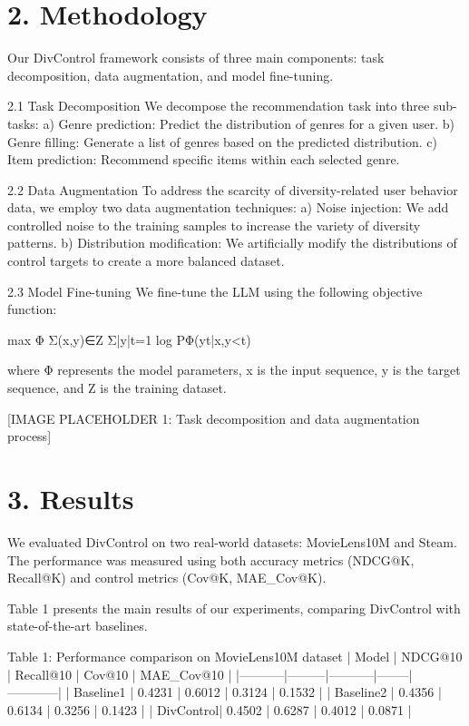 \documentclass[10pt,twocolumn,letterpaper]{article}
\begin{document}
\section{2. Methodology}

Our DivControl framework consists of three main components: task decomposition, data augmentation, and model fine-tuning.

2.1 Task Decomposition
We decompose the recommendation task into three sub-tasks:
a) Genre prediction: Predict the distribution of genres for a given user.
b) Genre filling: Generate a list of genres based on the predicted distribution.
c) Item prediction: Recommend specific items within each selected genre.

2.2 Data Augmentation
To address the scarcity of diversity-related user behavior data, we employ two data augmentation techniques:
a) Noise injection: We add controlled noise to the training samples to increase the variety of diversity patterns.
b) Distribution modification: We artificially modify the distributions of control targets to create a more balanced dataset.

2.3 Model Fine-tuning
We fine-tune the LLM using the following objective function:

max Φ Σ(x,y)∈Z Σ|y|t=1 log PΦ(yt|x,y<t)

where Φ represents the model parameters, x is the input sequence, y is the target sequence, and Z is the training dataset.

[IMAGE PLACEHOLDER 1: Task decomposition and data augmentation process]

\section{3. Results}

We evaluated DivControl on two real-world datasets: MovieLens10M and Steam. The performance was measured using both accuracy metrics (NDCG@K, Recall@K) and control metrics (Cov@K, MAE_Cov@K).

Table 1 presents the main results of our experiments, comparing DivControl with state-of-the-art baselines.

Table 1: Performance comparison on MovieLens10M dataset
| Model     | NDCG@10 | Recall@10 | Cov@10 | MAE_Cov@10 |
|-----------|---------|-----------|--------|------------|
| Baseline1 | 0.4231  | 0.6012    | 0.3124 | 0.1532     |
| Baseline2 | 0.4356  | 0.6134    | 0.3256 | 0.1423     |
| DivControl| 0.4502  | 0.6287    | 0.4012 | 0.0871     |
\end{document}
